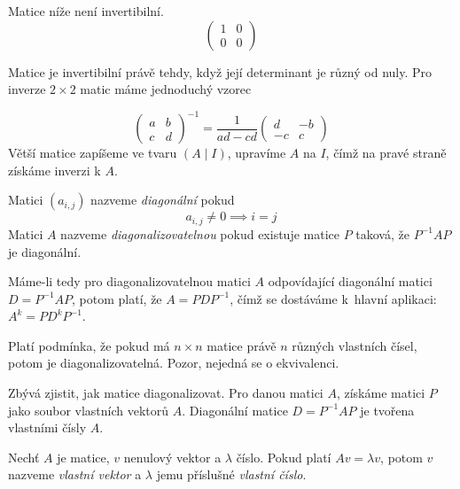 \begin{example}
    Matice níže není invertibilní.
    \[
        \begin{pmatrix}
            1 & 0 \\
            0 & 0
        \end{pmatrix}
    \]
\end{example}

Matice je invertibilní právě tehdy, když její determinant je různý od
nuly. Pro inverze $2 \times 2$ matic máme jednoduchý vzorec

    \[
        \begin{pmatrix}
            a & b \\
            c & d
        \end{pmatrix}^{-1}
        =
        \frac{1}{ad - cd}
        \begin{pmatrix}
            d & -b \\
            -c & c
        \end{pmatrix}
    \]
Větší matice zapíšeme ve tvaru $(A \mid I)$, upravíme $A$ na $I$, čímž
na pravé straně získáme inverzi k $A$.

\begin{definition}
    Matici $(a_{i,j})$ nazveme {\em diagonální} pokud
    \[ a_{i,j} \neq 0 \implies i = j \]
    Matici $A$ nazveme {\em diagonalizovatelnou} pokud existuje matice
    $P$ taková, že \linebreak $P^{-1} A P$ je diagonální.
\end{definition}

Máme-li tedy pro diagonalizovatelnou matici $A$ odpovídající diagonální
matici $D = P^{-1} A P$, potom platí, že $A = P D P^{-1}$, čímž se
dostáváme k~hlavní aplikaci: $A^k = P D^k P^{-1}$.

Platí podmínka, že pokud má $n \times n$ matice právě $n$ různých
vlastních čísel, potom je diagonalizovatelná. Pozor, nejedná se o
ekvivalenci.

Zbývá zjistit, jak matice diagonalizovat.
Pro danou matici $A$, získáme matici $P$ jako
soubor vlastních vektorů $A$. Diagonální matice
$D = P^{-1} A P$ je tvořena vlastními čísly $A$.

\begin{definition}
    Nechť $A$ je matice, $v$ nenulový vektor a $\lambda$ číslo.
    Pokud platí $A v = \lambda v$, potom $v$ nazveme {\em vlastní
    vektor} a $\lambda$ jemu příslušné {\em vlastní číslo}.
\end{definition}

